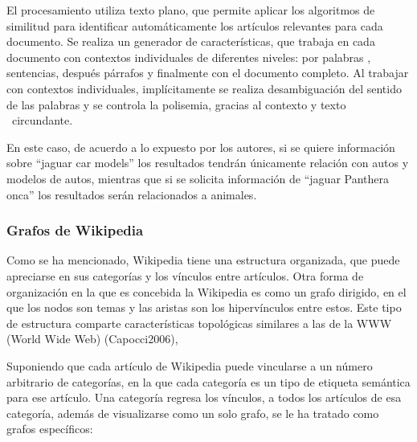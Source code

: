 \documentclass[letterpaper]{article}
\newcommand\textstylebibuscitbase[1]{#1}
\begin{document}
\bigskip

{\sffamily
El procesamiento utiliza texto plano, que permite aplicar los algoritmos
de similitud para identificar autom\'aticamente los art\'iculos
relevantes para cada documento. Se realiza un generador de
caracter\'isticas, que trabaja en cada documento con contextos
individuales de diferentes niveles: por palabras , sentencias,
despu\'es p\'arrafos y finalmente con el documento completo. Al
trabajar con contextos individuales, impl\'icitamente se realiza
desambiguaci\'on del sentido de las palabras y se controla la
polisemia, gracias al contexto y texto \ circundante.}


\bigskip

{\sffamily
En este caso, de acuerdo a lo expuesto por los autores, si se quiere
informaci\'on sobre {\textquotedblleft}jaguar car
models{\textquotedblright} los resultados tendr\'an \'unicamente
relaci\'on con autos y modelos de autos, mientras que si se solicita
informaci\'on de {\textquotedblleft}jaguar Panthera
onca{\textquotedblright} los resultados ser\'an relacionados a
animales.}


\bigskip


\bigskip

\subsubsection[Grafos de Wikipedia]{Grafos de Wikipedia}
\hypertarget{RefHeading333457232820}{}
\bigskip

{\sffamily
Como se ha mencionado, Wikipedia tiene una estructura organizada, que
puede apreciarse en sus categor\'ias y los v\'inculos entre
art\'iculos. Otra forma de organizaci\'on en la que es concebida la
Wikipedia es como un grafo dirigido, en el que los nodos son temas y
las aristas son los hiperv\'inculos entre estos. Este tipo de
estructura comparte caracter\'isticas topol\'ogicas similares a las de
la WWW (World Wide Web) \textstylebibuscitbase{(Capocci2006)},}


\bigskip

{\sffamily
Suponiendo que cada art\'iculo de Wikipedia puede vincularse a un
n\'umero arbitrario de categor\'ias, en la que cada categor\'ia es un
tipo de etiqueta sem\'antica para ese art\'iculo. Una categor\'ia
regresa los v\'inculos, a todos los art\'iculos de esa categor\'ia,
adem\'as de visualizarse como un solo grafo, se le ha tratado como
grafos espec\'ificos: }
\end{document}
